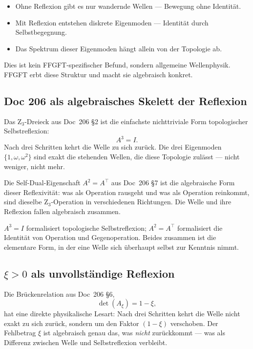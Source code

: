 \begin{itemize}
\item Ohne Reflexion gibt es nur wandernde Wellen --- Bewegung ohne Identität.
\item Mit Reflexion entstehen diskrete Eigenmoden --- Identität durch Selbstbegegnung.
\item Das Spektrum dieser Eigenmoden hängt allein von der Topologie ab.
\end{itemize}

Dies ist kein FFGFT-spezifischer Befund, sondern allgemeine Wellenphysik. FFGFT erbt diese Struktur und macht sie algebraisch konkret.

\subsection{Doc 206 als algebraisches Skelett der Reflexion}\label{sec:reflexion_doc206}

Das Z$_3$-Dreieck aus Doc~206 \S2 ist die einfachste nichttriviale Form topologischer Selbstreflexion:
\begin{equation}
A^3 = I.
\end{equation}
Nach drei Schritten kehrt die Welle zu sich zurück. Die drei Eigenmoden $\{1, \omega, \omega^2\}$ sind exakt die stehenden Wellen, die diese Topologie zulässt --- nicht weniger, nicht mehr.

Die Self-Dual-Eigenschaft $A^2 = A^\top$ aus Doc~206 \S7 ist die algebraische Form dieser Reflexivität: was als Operation rausgeht und was als Operation reinkommt, sind dieselbe Z$_3$-Operation in verschiedenen Richtungen. Die Welle und ihre Reflexion fallen algebraisch zusammen.

\begin{insightBox}
$A^3 = I$ formalisiert topologische Selbstreflexion; $A^2 = A^\top$ formalisiert die Identität von Operation und Gegenoperation. Beides zusammen ist die elementare Form, in der eine Welle sich überhaupt \glqq selbst zur Kenntnis nimmt\grqq{}.
\end{insightBox}

\subsection{\texorpdfstring{$\xi > 0$ als unvollständige Reflexion}{xi > 0 als unvollständige Reflexion}}\label{sec:reflexion_xi}

Die Brückenrelation aus Doc~206 \S6,
\begin{equation}
\det(A_\xi) = 1 - \xi,
\end{equation}
hat eine direkte physikalische Lesart: Nach drei Schritten kehrt die Welle nicht exakt zu sich zurück, sondern um den Faktor $(1-\xi)$ verschoben. Der Fehlbetrag $\xi$ ist algebraisch genau das, was \emph{nicht} zurückkommt --- was als Differenz zwischen Welle und Selbstreflexion verbleibt.

